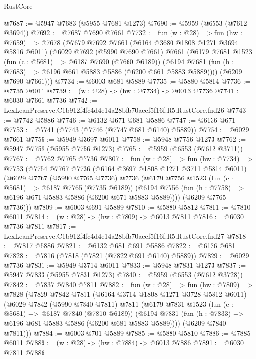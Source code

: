 \begin{lexlean}{RustCore}
\begin{coremodule}
@7687 := @5947 @7683 (@5955 @7681 @1273)
@7690 := @5959 (@6553 (@7612 @3694))
@7692 := @7687 @7690 @7661
@7732 := fun (w : @28) =>
  fun (hw : @7659) =>
  @7678
    (@7679
      @7692
      @7661
      (@6164 @3680 @1808 @1271 @3694 @5816 @6011)
      (@6029
        @7692
        (@5990 @7690 @7661)
        @7661
        (@6179
          @7681
          @1523
          (fun (c : @5681) => @6187 @7690 (@7660 @6189))
          (@6194 @7681 (fun (h : @7683) => @6196 @661 @5883 @5886 (@6200 @661 @5883 @5889))))
        (@6209 @7690 @7661)))
@7734 := @6003 @681 @5889
@7735 := @5880 @5814
@7736 := @7735 @6011
@7739 := (w : @28) -> (hw : @7734) -> @6013 @7736
@7741 := @6030 @7661 @7736
@7742 := LexLeanPreserve.C1b912f4fc4d4e14a28bfb70aeef5f16f.R5.RustCore.fnd26
@7743 := @7742 @5886
@7746 := @6132 @671 @681 @5886
@7747 := @6136 @671
@7753 := @7741 (@7743 (@7746 (@7747 @681 @6140) @5889))
@7754 := @6029 @7661
@7756 := @5949 @3697 @6011
@7758 := @5948 @7756 @1273
@7762 := @5947 @7758 (@5955 @7756 @1273)
@7765 := @5959 (@6553 (@7612 @3711))
@7767 := @7762 @7765 @7736
@7807 := fun (w : @28) =>
  fun (hw : @7734) =>
  @7753
    (@7754
      @7767
      @7736
      (@6164 @3697 @1808 @1271 @3711 @5814 @6011)
      (@6029
        @7767
        (@5990 @7765 @7736)
        @7736
        (@6179
          @7756
          @1523
          (fun (c : @5681) => @6187 @7765 (@7735 @6189))
          (@6194 @7756 (fun (h : @7758) => @6196 @671 @5883 @5886 (@6200 @671 @5883 @5889))))
        (@6209 @7765 @7736)))
@7809 := @6003 @691 @5889
@7810 := @5880 @5812
@7811 := @7810 @6011
@7814 := (w : @28) -> (hw : @7809) -> @6013 @7811
@7816 := @6030 @7736 @7811
@7817 := LexLeanPreserve.C1b912f4fc4d4e14a28bfb70aeef5f16f.R5.RustCore.fnd27
@7818 := @7817 @5886
@7821 := @6132 @681 @691 @5886
@7822 := @6136 @681
@7828 := @7816 (@7818 (@7821 (@7822 @691 @6140) @5889))
@7829 := @6029 @7736
@7831 := @5949 @3714 @6011
@7833 := @5948 @7831 @1273
@7837 := @5947 @7833 (@5955 @7831 @1273)
@7840 := @5959 (@6553 (@7612 @3728))
@7842 := @7837 @7840 @7811
@7882 := fun (w : @28) =>
  fun (hw : @7809) =>
  @7828
    (@7829
      @7842
      @7811
      (@6164 @3714 @1808 @1271 @3728 @5812 @6011)
      (@6029
        @7842
        (@5990 @7840 @7811)
        @7811
        (@6179
          @7831
          @1523
          (fun (c : @5681) => @6187 @7840 (@7810 @6189))
          (@6194 @7831 (fun (h : @7833) => @6196 @681 @5883 @5886 (@6200 @681 @5883 @5889))))
        (@6209 @7840 @7811)))
@7884 := @6003 @701 @5889
@7885 := @5880 @5810
@7886 := @7885 @6011
@7889 := (w : @28) -> (hw : @7884) -> @6013 @7886
@7891 := @6030 @7811 @7886

\end{coremodule}
\end{lexlean}

